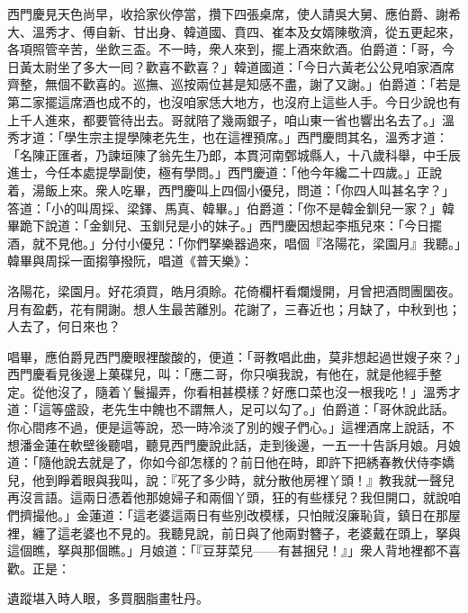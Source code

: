 西門慶見天色尚早，收拾家伙停當，攢下四張桌席，使人請吳大舅、應伯爵、謝希大、溫秀才、傅自新、甘出身、韓道國、賁四、崔本及女婿陳敬濟，從五更起來，各項照管辛苦，坐飲三盃。不一時，衆人來到，擺上酒來飲酒。伯爵道：「哥，今日黃太尉坐了多大一囘？歡喜不歡喜？」韓道國道：「今日六黃老公公見咱家酒席齊整，無個不歡喜的。巡撫、巡按兩位甚是知感不盡，謝了又謝。」伯爵道：「若是第二家擺這席酒也成不的，也沒咱家恁大地方，也沒府上這些人手。今日少說也有上千人進來，都要管待出去。哥就陪了幾兩銀子，咱山東一省也響出名去了。」溫秀才道：「學生宗主提學陳老先生，也在這裡預席。」{}西門慶問其名，溫秀才道：「名陳正匯者，乃諫垣陳了翁先生乃郎，本貫河南鄄城縣人，十八歲科舉，中壬辰進士，今任本處提學副使，極有學問。」西門慶道：「他今年纔二十四歲。」正說着，湯飯上來。衆人吃畢，西門慶叫上四個小優兒，問道：「你四人叫甚名字？」答道：「小的叫周採、梁鐸、馬真、韓畢。」伯爵道：「你不是韓金釧兒一家？」韓畢跪下說道：「金釧兒、玉釧兒是小的妹子。」西門慶因想起李瓶兒來：「今日擺酒，就不見他。」分付小優兒：「你們拏樂器過來，唱個『洛陽花，梁園月』我聽。」韓畢與周採一面搊箏撥阮，唱道《普天樂》：

洛陽花，梁園月。好花須買，皓月須賒。花倚欄杆看爛熳開，月曾把酒問團圞夜。月有盈虧，花有開謝。想人生最苦離別。花謝了，三春近也；月缺了，中秋到也；人去了，何日來也？{}

唱畢，應伯爵見西門慶眼裡酸酸的，便道：「哥教唱此曲，莫非想起過世嫂子來？」西門慶看見後邊上菓碟兒，叫：「應二哥，你只嗔我說，有他在，就是他經手整定。從他沒了，隨着丫鬟撮弄，你看相甚模樣？好應口菜也沒一根我吃！」{}溫秀才道：「這等盛設，老先生中餽也不謂無人，足可以勾了。」伯爵道：「哥休說此話。你心間疼不過，便是這等說，恐一時冷淡了別的嫂子們心。」{}這裡酒席上說話，不想潘金蓮在軟壁後聽唱，聽見西門慶說此話，走到後邊，一五一十告訴月娘。月娘道：「隨他說去就是了，你如今卻怎樣的？前日他在時，即許下把綉春教伏侍李嬌兒，他到睜着眼與我叫，說：『死了多少時，就分散他房裡丫頭！』教我就一聲兒再沒言語。這兩日憑着他那媳婦子和兩個丫頭，狂的有些樣兒？我但開口，就說咱們擠撮他。」金蓮道：「這老婆這兩日有些別改模樣，只怕賊沒廉恥貨，鎮日在那屋裡，纏了這老婆也不見的。我聽見說，前日與了他兩對簪子，老婆戴在頭上，拏與這個瞧，拏與那個瞧。」月娘道：「『豆芽菜兒——有甚捆兒！』」衆人背地裡都不喜歡。正是：

遺蹤堪入時人眼，多買胭脂畫牡丹。

